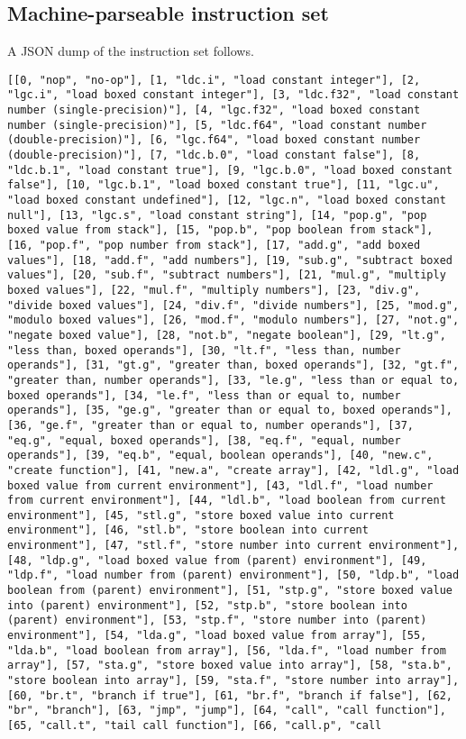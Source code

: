 \documentclass[11pt]{article}
\begin{document}
\subsection{Machine-parseable instruction set}
\label{sec:org5fffbe9}
A JSON dump of the instruction set follows.

\begin{verbatim}
[[0, "nop", "no-op"], [1, "ldc.i", "load constant integer"], [2, "lgc.i", "load boxed constant integer"], [3, "ldc.f32", "load constant number (single-precision)"], [4, "lgc.f32", "load boxed constant number (single-precision)"], [5, "ldc.f64", "load constant number (double-precision)"], [6, "lgc.f64", "load boxed constant number (double-precision)"], [7, "ldc.b.0", "load constant false"], [8, "ldc.b.1", "load constant true"], [9, "lgc.b.0", "load boxed constant false"], [10, "lgc.b.1", "load boxed constant true"], [11, "lgc.u", "load boxed constant undefined"], [12, "lgc.n", "load boxed constant null"], [13, "lgc.s", "load constant string"], [14, "pop.g", "pop boxed value from stack"], [15, "pop.b", "pop boolean from stack"], [16, "pop.f", "pop number from stack"], [17, "add.g", "add boxed values"], [18, "add.f", "add numbers"], [19, "sub.g", "subtract boxed values"], [20, "sub.f", "subtract numbers"], [21, "mul.g", "multiply boxed values"], [22, "mul.f", "multiply numbers"], [23, "div.g", "divide boxed values"], [24, "div.f", "divide numbers"], [25, "mod.g", "modulo boxed values"], [26, "mod.f", "modulo numbers"], [27, "not.g", "negate boxed value"], [28, "not.b", "negate boolean"], [29, "lt.g", "less than, boxed operands"], [30, "lt.f", "less than, number operands"], [31, "gt.g", "greater than, boxed operands"], [32, "gt.f", "greater than, number operands"], [33, "le.g", "less than or equal to, boxed operands"], [34, "le.f", "less than or equal to, number operands"], [35, "ge.g", "greater than or equal to, boxed operands"], [36, "ge.f", "greater than or equal to, number operands"], [37, "eq.g", "equal, boxed operands"], [38, "eq.f", "equal, number operands"], [39, "eq.b", "equal, boolean operands"], [40, "new.c", "create function"], [41, "new.a", "create array"], [42, "ldl.g", "load boxed value from current environment"], [43, "ldl.f", "load number from current environment"], [44, "ldl.b", "load boolean from current environment"], [45, "stl.g", "store boxed value into current environment"], [46, "stl.b", "store boolean into current environment"], [47, "stl.f", "store number into current environment"], [48, "ldp.g", "load boxed value from (parent) environment"], [49, "ldp.f", "load number from (parent) environment"], [50, "ldp.b", "load boolean from (parent) environment"], [51, "stp.g", "store boxed value into (parent) environment"], [52, "stp.b", "store boolean into (parent) environment"], [53, "stp.f", "store number into (parent) environment"], [54, "lda.g", "load boxed value from array"], [55, "lda.b", "load boolean from array"], [56, "lda.f", "load number from array"], [57, "sta.g", "store boxed value into array"], [58, "sta.b", "store boolean into array"], [59, "sta.f", "store number into array"], [60, "br.t", "branch if true"], [61, "br.f", "branch if false"], [62, "br", "branch"], [63, "jmp", "jump"], [64, "call", "call function"], [65, "call.t", "tail call function"], [66, "call.p", "call 
\end{verbatim}
\end{document}
